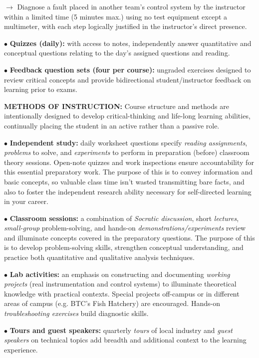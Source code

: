 \item\item{$\rightarrow$} Diagnose a fault placed in another team's control system by the instructor within a limited time (5 minutes max.) using no test equipment except a multimeter, with each step logically justified in the instructor's direct presence.
\vskip 5pt
\item{$\bullet$} {\bf Quizzes (daily):} with access to notes, independently answer quantitative and conceptual questions relating to the day's assigned questions and reading.
\vskip 5pt
\item{$\bullet$} {\bf Feedback question sets (four per course):} ungraded exercises designed to review critical concepts and provide bidirectional student/instructor feedback on learning prior to exams.


\vfil \eject

\noindent
{\bf METHODS OF INSTRUCTION:} Course structure and methods are intentionally designed to develop critical-thinking and life-long learning abilities, continually placing the student in an active rather than a passive role.  

\item{$\bullet$} {\bf Independent study:} daily worksheet questions specify {\it reading assignments}, {\it problems} to solve, and {\it experiments} to perform in preparation (before) classroom theory sessions.  Open-note quizzes and work inspections ensure accountability for this essential preparatory work.  The purpose of this is to convey information and basic concepts, so valuable class time isn't wasted transmitting bare facts, and also to foster the independent research ability necessary for self-directed learning in your career.
\item{$\bullet$} {\bf Classroom sessions:} a combination of {\it Socratic discussion}, short {\it lectures}, {\it small-group} problem-solving, and hands-on {\it demonstrations/experiments} review and illuminate concepts covered in the preparatory questions.  The purpose of this is to develop problem-solving skills, strengthen conceptual understanding, and practice both quantitative and qualitative analysis techniques.
\item{$\bullet$} {\bf Lab activities:} an emphasis on constructing and documenting {\it working projects} (real instrumentation and control systems) to illuminate theoretical knowledge with practical contexts.  Special projects off-campus or in different areas of campus (e.g. BTC's Fish Hatchery) are encouraged.  Hands-on {\it troubleshooting exercises} build diagnostic skills.
\item{$\bullet$} {\bf Tours and guest speakers:} quarterly {\it tours} of local industry and {\it guest speakers} on technical topics add breadth and additional context to the learning experience.

